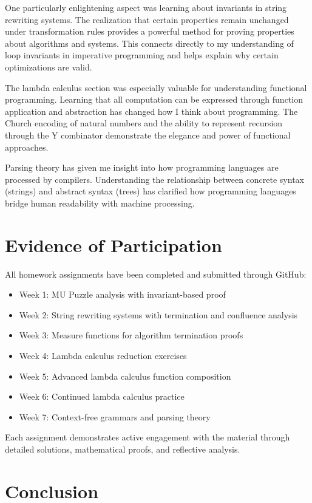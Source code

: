 \documentclass{article}
\theoremstyle{plain}
\theoremstyle{definition}
\theoremstyle{remark}
\begin{document}
One particularly enlightening aspect was learning about invariants in string rewriting systems. The realization that certain properties remain unchanged under transformation rules provides a powerful method for proving properties about algorithms and systems. This connects directly to my understanding of loop invariants in imperative programming and helps explain why certain optimizations are valid.

The lambda calculus section was especially valuable for understanding functional programming. Learning that all computation can be expressed through function application and abstraction has changed how I think about programming. The Church encoding of natural numbers and the ability to represent recursion through the Y combinator demonstrate the elegance and power of functional approaches.

Parsing theory has given me insight into how programming languages are processed by compilers. Understanding the relationship between concrete syntax (strings) and abstract syntax (trees) has clarified how programming languages bridge human readability with machine processing.

\section{Evidence of Participation}

All homework assignments have been completed and submitted through GitHub:
\begin{itemize}
\item Week 1: MU Puzzle analysis with invariant-based proof
\item Week 2: String rewriting systems with termination and confluence analysis
\item Week 3: Measure functions for algorithm termination proofs
\item Week 4: Lambda calculus reduction exercises
\item Week 5: Advanced lambda calculus function composition
\item Week 6: Continued lambda calculus practice
\item Week 7: Context-free grammars and parsing theory
\end{itemize}

Each assignment demonstrates active engagement with the material through detailed solutions, mathematical proofs, and reflective analysis.

\section{Conclusion}\label{conclusion}
\end{document}
